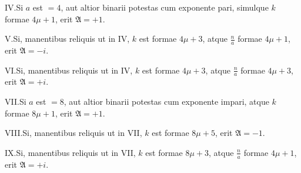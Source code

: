 IV.\quad Si $a$ est $=4$, aut altior binarii potestas cum exponente pari, simulque $k$ formae $4\mu+1$, erit $\mathfrak A=+1$.

V.\quad Si, manentibus reliquis ut in IV, $k$ est formae $4\mu+3$, atque $\frac{n}{a}$ formae $4\mu+1$, erit $\mathfrak A=-i$.

VI.\quad Si, manentibus reliquis ut in IV, $k$ est formae $4\mu+3$, atque $\frac{n}{a}$ formae $4\mu+3$, erit $\mathfrak A=+i$.

VII.\quad Si $a$ est $=8$, aut altior binarii potestas cum exponente impari, atque $k$ formae $8\mu+1$, erit $\mathfrak A=+1$.

VIII.\quad Si, manentibus reliquis ut in VII, $k$ est formae $8\mu+5$, erit $\mathfrak A=-1$.

IX.\quad Si, manentibus reliquis ut in VII, $k$ est formae $8\mu+3$, atque $\frac{n}{a}$ formae $4\mu+1$, erit $\mathfrak A=+i$.

